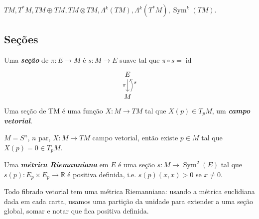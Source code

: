 \begin{example}\leavevmode
	\(TM,T^* M,TM \oplus  TM, TM \otimes TM, \Lambda^{k}(TM),\Lambda^{k}(T^*M),\operatorname{Sym}^k(TM)\).
\end{example}

\subsection{Seções}

\begin{defn}\leavevmode
	Uma \textit{\textbf{seção}} de \(\pi:E \to M\) é \(s:M \to E\) suave tal que \(\pi \circ s = \operatorname{id}\)
\[\begin{tikzcd}
E\arrow[d,"\pi",swap]\\
M \arrow[u, bend right,swap,"s"]
\end{tikzcd}\]
Uma seção de TM é uma função \(X: M \to TM\) tal que \(X(p) \in T_pM\), um \textit{\textbf{campo vetorial}}.
\end{defn}

\begin{thm}\leavevmode
\(M = S^{n}\), \(n\) par, \(X:M \to TM\) campo vetorial, então existe \(p \in M\) tal que \(X(p)=0 \in T_pM\).
\end{thm}


\begin{defn}\leavevmode
	Uma \textit{\textbf{métrica Riemanniana}} em \(E\) é uma seção \(s: M \to \operatorname{Sym}^2(E)\) tal que \(s(p):E_p \times E_p \to \mathbb{R}\) é positiva definida, i.e. \(s(p)(x,x)>0\) se \(x \neq  0\).
\end{defn}

\begin{remark}[Aprox.]\leavevmode
	Todo fibrado vetorial tem uma métrica Riemanniana: usando a métrica euclidiana dada em cada carta, usamos uma partição da unidade para extender a uma seção global, somar e notar que fica positiva definida.
\end{remark}

